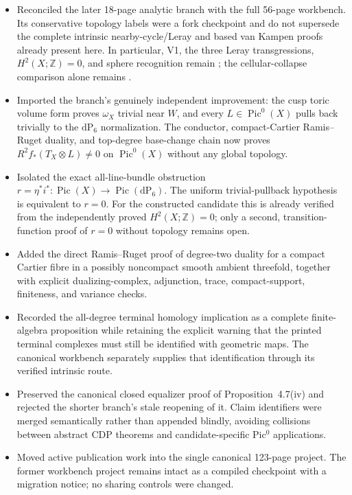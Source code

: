 \begin{itemize}[leftmargin=1.8em]
\item Reconciled the later 18-page analytic branch with the full 56-page
workbench.  Its conservative topology labels were a fork checkpoint and do
not supersede the complete intrinsic nearby-cycle/Leray and based van Kampen
proofs already present here.  In particular, V1, the three Leray
transgressions, $H^2(X;\mathbb Z)=0$, and sphere recognition remain
\Verified; the cellular-collapse comparison alone remains \Open.
\item Imported the branch's genuinely independent improvement: the cusp
toric volume form proves $\omega_X$ trivial near $W$, and every
$L\in\operatorname{Pic}^0(X)$ pulls back trivially to the
$\mathrm{dP}_6$ normalization.  The conductor, compact-Cartier
Ramis--Ruget duality, and top-degree base-change chain now proves
$R^2f_*(T_X\otimes L)\ne0$ on $\operatorname{Pic}^0(X)$ without any global
topology.
\item Isolated the exact all-line-bundle obstruction
$r=\eta^*i^*:\operatorname{Pic}(X)\to\operatorname{Pic}(\mathrm{dP}_6)$.
The uniform trivial-pullback hypothesis is equivalent to $r=0$.  For the
constructed candidate this is already verified from the independently proved
$H^2(X;\mathbb Z)=0$; only a second, transition-function proof of $r=0$
without topology remains open.
\item Added the direct Ramis--Ruget proof of degree-two duality for a compact
Cartier fibre in a possibly noncompact smooth ambient threefold, together
with explicit dualizing-complex, adjunction, trace, compact-support,
finiteness, and variance checks.
\item Recorded the all-degree terminal homology implication as a complete
finite-algebra proposition while retaining the explicit warning that the
printed terminal complexes must still be identified with geometric maps.
The canonical workbench separately supplies that identification through its
verified intrinsic route.
\item Preserved the canonical closed equalizer proof of Proposition~4.7(iv)
and rejected the shorter branch's stale reopening of it.  Claim identifiers
were merged semantically rather than appended blindly, avoiding collisions
between abstract CDP theorems and candidate-specific Pic$^0$ applications.
\item Moved active publication work into the single canonical 123-page
project.  The former workbench project remains intact as a compiled
checkpoint with a migration notice; no sharing controls were changed.
\end{itemize}

